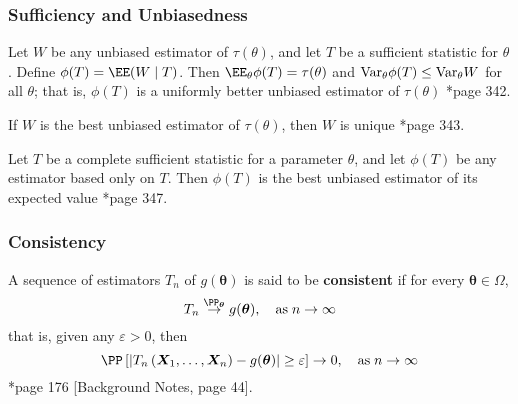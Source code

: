 \subsubsection*{Sufficiency and Unbiasedness}

\begin{thm} \label{thm: rao_bw_thrm}
    Let $W$ be any unbiased estimator of $\tau (\theta)$, and let $T$ be a sufficient statistic for $\theta$. Define $\phi (T) = \EE (W \mid T)$. Then $\EE_{\theta} \phi (T) = \tau (\theta)$ and ${\operatorname{Var}}_{\theta} \phi (T) \leq {\operatorname{Var}}_{\theta} W$ for all $\theta$; that is, $\phi (T)$ is a uniformly better unbiased estimator of $\tau (\theta)$ \cite{CasellaGeorge2001SI}*{page 342}.
\end{thm}

\begin{thm} \label{thm: best_unbiased_uniq}
    If $W$ is the best unbiased estimator of $\tau (\theta)$, then $W$ is unique \cite{CasellaGeorge2001SI}*{page 343}.
\end{thm}

\begin{thm} \label{thm: best_css_est}
    Let $T$ be a complete sufficient statistic for a parameter $\theta$, and let $\phi (T)$ be any estimator based only on $T$. Then $\phi (T)$ is the best unbiased estimator of its expected value \cite{CasellaGeorge2001SI}*{page 347}.
\end{thm}

\subsubsection*{Consistency}

\begin{defe}[Consistency] \label{defe: consistent}
    A sequence of estimators $T_n$ of $g(\bm{\theta})$ is said to be {\bf consistent} if for every $\bm{\theta} \in \Omega$,
    \begin{equation*}
        T_n \overset{\PP_{\bm{\theta}}}{\to} g (\bm{\theta}), \quad \text{as} \; n \to \infty
    \end{equation*}
    that is, given any $\varepsilon > 0$, then
    \begin{equation*}
        \PP \left[ \left| T_n \left( \bm{X}_1 , \ldots , \bm{X}_n \right) - g (\bm{\theta}) \right| \geq \varepsilon \right] \to 0, \quad \text{as} \; n \to \infty
    \end{equation*}
    \cite{KroeseDirkP2013SMaC}*{page 176} [Background Notes, page 44].
\end{defe}

